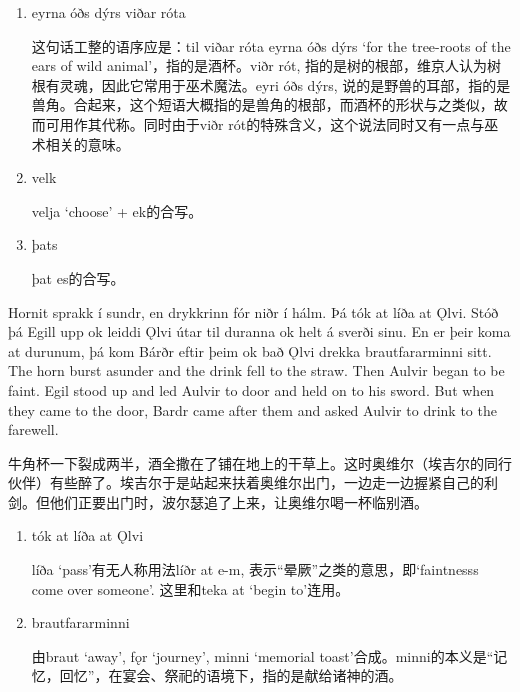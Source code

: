 \begin{grammar*}{}
    \begin{enumerate}[leftmargin=*]
        \item eyrna óðs dýrs viðar róta

              这句话工整的语序应是：til viðar róta eyrna óðs dýrs `for the tree-roots of the ears of wild animal'，指的是酒杯。viðr rót, 指的是树的根部，维京人认为树根有灵魂，因此它常用于巫术魔法。eyri óðs dýrs, 说的是野兽的耳部，指的是兽角。合起来，这个短语大概指的是兽角的根部，而酒杯的形状与之类似，故而可用作其代称。同时由于viðr rót的特殊含义，这个说法同时又有一点与巫术相关的意味。

        \item velk

              velja `choose' + ek的合写。
        \item þats

              þat es的合写。

    \end{enumerate}
\end{grammar*}
\begin{paracol}{2}
    Hornit sprakk í sundr, en drykkrinn fór niðr í hálm. Þá tók at líða at Ǫlvi. Stóð þá Egill upp ok leiddi Ǫlvi útar til duranna ok helt á sverði sinu. En er þeir koma at durunum, þá kom Bárðr eftir þeim ok bað Ǫlvi drekka brautfararminni sitt.
    \switchcolumn
    The horn burst asunder and the drink fell to the straw. Then Aulvir began to be faint. Egil stood up and led Aulvir to door and held on to his sword. But when they came to the door, Bardr came after them and asked Aulvir to drink to the farewell.
\end{paracol}
\begin{translation*}{}
    牛角杯一下裂成两半，酒全撒在了铺在地上的干草上。这时奥维尔（埃吉尔的同行伙伴）有些醉了。埃吉尔于是站起来扶着奥维尔出门，一边走一边握紧自己的利剑。但他们正要出门时，波尔瑟追了上来，让奥维尔喝一杯临别酒。
\end{translation*}
\begin{grammar*}{}
    \begin{enumerate}[leftmargin=*]
        \item tók at líða at Ǫlvi

              líða `pass'有无人称用法líðr at e-m, 表示“晕厥”之类的意思，即`faintnesss come over someone'. 这里和teka at `begin to'连用。

        \item brautfararminni

              由braut `away', fǫr `journey', minni `memorial toast'合成。minni的本义是“记忆，回忆”，在宴会、祭祀的语境下，指的是献给诸神的酒。
    \end{enumerate}
\end{grammar*}
